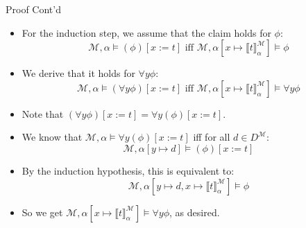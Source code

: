 \begin{frame}{Proof Cont'd}

  \begin{itemize}

  \item For the induction step, we assume that the claim holds for
    $\phi$:
    \[\mathcal{M},\alpha\vDash (\phi)[x:=t]\text{ iff
              }\mathcal{M},\alpha[x\mapsto \llbracket
              t\rrbracket^\mathcal{M}_\alpha]\vDash \phi\]

   \item We derive that it holds for $\forall y\phi$:
            \[\mathcal{M},\alpha\vDash (\forall
              y\phi)[x:=t]\text{ iff }
              \mathcal{M},\alpha[x\mapsto \llbracket
              t\rrbracket^\mathcal{M}_\alpha]\vDash \forall
              y\phi\]

    \item Note that $(\forall y\phi)[x:=t]=\forall y(\phi)[x:=t]$.

    \item We know that $\mathcal{M},\alpha\vDash \forall
      y(\phi)[x:=t]$ iff for all $d\in
      D^\mathcal{M}$: \[\mathcal{M},\alpha[y\mapsto d]\vDash
        (\phi)[x:=t]\]

    \item By the induction hypothesis, this is equivalent to:
      \[\mathcal{M},\alpha[y\mapsto d, x\mapsto \llbracket
        t\rrbracket^\mathcal{M}_\alpha]\vDash \phi\]

      \item So we get $\mathcal{M},\alpha[x\mapsto \llbracket
              t\rrbracket^\mathcal{M}_\alpha]\vDash \forall
              y\phi$, as desired.
    
  \end{itemize}
  
\end{frame}

